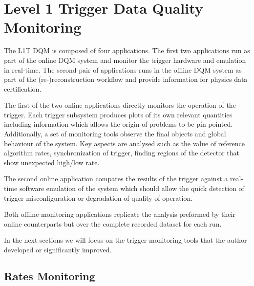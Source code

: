 \section{Level 1 Trigger Data Quality Monitoring}
\label{SECTION:TechnicalWork_L1TDQM}


The \gls{L1T} \gls{DQM} is composed of four applications. The first two applications run as part of the online \gls{DQM} system and monitor the trigger hardware and emulation in real-time. The second pair of applications runs in the offline \gls{DQM} system as part of the (re-)reconstruction workflow and provide information for physics data certification.

The first of the two online applications directly monitors the operation of the trigger. Each trigger subsystem produces plots of its own relevant quantities including information which allows the origin of problems to be pin pointed. Additionally, a set of monitoring tools observe the final objects and global behaviour of the system. Key aspects are analysed such as the value of reference algorithm rates, synchronization of trigger, finding regions of the detector that show unexpected high/low rate. 

The second online application compares the results of the trigger against a real-time software emulation of the system which should allow the quick detection of trigger misconfiguration or degradation of quality of operation.

Both offline monitoring applications replicate the analysis preformed by their online counterparts but over the complete recorded dataset for each run.

In the next sections we will focus on the trigger monitoring tools that the author developed or significantly improved.

\subsection{Rates Monitoring}
\label{SECTION:TechnicalWork_L1TDQM_RatesMonitoring}

